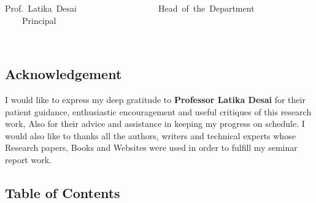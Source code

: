 \documentclass[12pt]{article}
\begin{document}
\vspace{\baselineskip}

\vspace{\baselineskip}



\begin{FlushLeft}
Prof.\ Latika\ Desai\ \ \ \ \ \ \ \ \ \ \ \ \ \ \ \ \ \  \ Head\ of\ the\ Department\ \ \ \ \ \ \ \ \ \ \ \ \ \ \ \ \ Principal  
\end{FlushLeft}\par

\begin{FlushLeft}
\ \ \ \ \ \ \ \ \ \ \ \ \ \ \  
\end{FlushLeft}\par




\newpage
\thispagestyle{empty}
\vspace{\baselineskip}\begin{adjustwidth}{1.5in}{0.0in}
\section*{Acknowledgement}
\end{adjustwidth}


\vspace{\baselineskip}
{\fontsize{14pt}{16.8pt}\selectfont I would like to express my deep gratitude to \textbf{Professor Latika Desai} for their patient guidance, enthusiastic encouragement and useful critiques of this research work, Also for their advice and assistance in keeping my progress on schedule. I would also like to thanks all the authors, writers and technical experts whose Research papers, Books and Websites were used in order to fulfill my seminar report work.\par}\par




\newpage

\vspace{\baselineskip}\begin{Center}
\section*{Table of Contents}
\end{Center}
\end{document}
